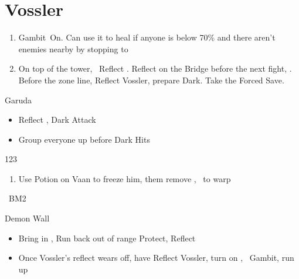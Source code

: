 \chapter{Vossler}

\begin{enumerate}
\item Gambit\ashe\ On. Can use it to heal if anyone is below 70\% and there aren't enemies nearby by stopping to \flee
\item On top of the tower, \vaan\ Reflect \vaan. Reflect on the Bridge before the next fight, \leader{\penelo}. Before the zone line, Reflect Vossler, prepare Dark. Take the Forced Save.
\end{enumerate}
\begin{battle}{Garuda}
\begin{itemize}
\item Reflect \penelo, \ashe
\penelof Dark \ashe
\ashef Attack \penelo
\item Group everyone up before Dark Hits
\end{itemize}
\end{battle}
\begin{shop}{123}
\end{shop}
\begin{enumerate}
\item Use Potion on Vaan to freeze him, them remove \ashe, \penelo\ to warp
\end{enumerate}
\begin{liscense}
\ashe\ BM2
\end{liscense}
\begin{gambit}
\begin{itemize}
\end{itemize}
\end{gambit}
\begin{battle}{Demon Wall}
\begin{itemize}
\item Bring in \ashe, \penelo
\vaanf Run back out of range
\vaanf Protect, Reflect \vaan
\item Once Vossler's reflect wears off, have \vaan Reflect Vossler, turn on \ashe, \penelo\ Gambit, run up
\end{itemize}
\end{battle}
